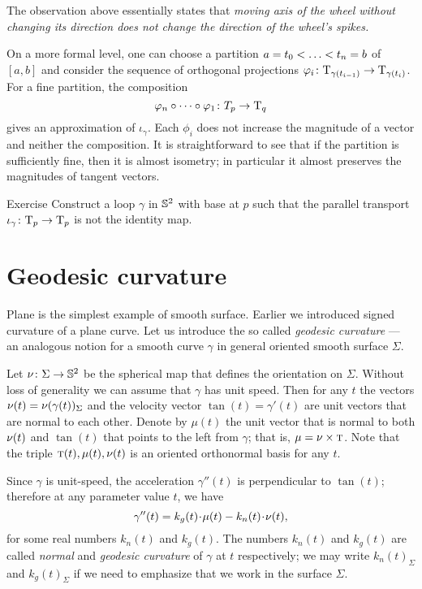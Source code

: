 The observation above essentially states that \emph{moving axis of the wheel without changing its direction does not change the direction of the wheel's spikes.}

On a more formal level, one can choose a partition $a=t_0<\dots\z<t_n=b$ of $[a,b]$
and consider the sequence of orthogonal projections $\varphi_i\colon\mathrm{T}_{\gamma(t_{i-1})}\to\mathrm{T}_{\gamma(t_i)}$.
For a fine partition, the composition 
\[\phi_n\circ\dots\circ\phi_1\:T_p\z\to\T_q\]
gives an approximation of $\iota_\gamma$.
Each $\phi_i$ does not increase the magnitude of a vector and neither the composition.
It is straightforward to see that if the partition is sufficiently fine, then it is almost isometry; in particular it almost preserves the magnitudes of tangent vectors.

\begin{thm}{Exercise}\label{ex:holonomy=not0}
Construct a loop $\gamma$ in $\mathbb{S}^2$ with base at $p$ such that the parallel transport $\iota_\gamma\colon\mathrm{T}_p\to\mathrm{T}_p$ is not the identity map.
\end{thm}

\section*{Geodesic curvature}

Plane is the simplest example of smooth surface.
Earlier we introduced signed curvature of a plane curve.
Let us introduce the so called \emph{geodesic curvature} --- an analogous notion for a smooth curve $\gamma$ in general oriented smooth surface $\Sigma$.


Let $\nu\colon\Sigma\to \mathbb{S}^2$ be the spherical map that defines the orientation on $\Sigma$.
Without loss of generality we can assume that $\gamma$ has unit speed.
Then for any $t$ the vectors $\nu(t)=\nu(\gamma(t))_\Sigma$ and the velocity vector $\tan(t)=\gamma'(t)$ are unit vectors that are normal to each other.
Denote by $\mu(t)$ the unit vector that is normal to both $\nu(t)$ and $\tan(t)$ that points to the left from $\gamma$; that is, $\mu=\nu\times \textsc{t}$.
Note that the triple $\textsc{t}(t),\mu(t),\nu(t)$ is an oriented orthonormal basis for any $t$.

Since $\gamma$ is unit-speed, the acceleration $\gamma''(t)$ is perpendicular to $\tan(t)$;
therefore at any parameter value $t$, we have
\[\gamma''(t)=k_g(t)\cdot \mu(t)-k_n(t)\cdot \Norm(t),\]
for some real numbers $k_n(t)$ and $k_g(t)$.
The numbers $k_n(t)$ and $k_g(t)$ are called \emph{normal} and \emph{geodesic curvature} of $\gamma$ at $t$ respectively;
we may write $k_n(t)_\Sigma$ and $k_g(t)_\Sigma$ if we need to emphasize that we work in the surface $\Sigma$.

